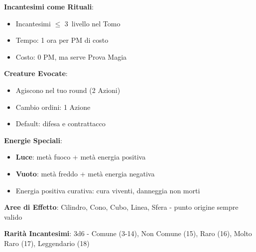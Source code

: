 \documentclass[10pt,a4paper,landscape]{article}
\begin{document}
	\begin{tcolorbox}[title=RITUALI E REGOLE SPECIALI]
		\textbf{Incantesimi come Rituali}: 
		\begin{itemize}[leftmargin=*,noitemsep]
			\item Incantesimi $\leq$ 3\textordmasculine\ livello nel Tomo
			\item Tempo: 1 ora per PM di costo
			\item Costo: 0 PM, ma serve Prova Magia
		\end{itemize}
		
		\textbf{Creature Evocate}:
		\begin{itemize}[leftmargin=*,noitemsep]
			\item Agiscono nel tuo round (2 Azioni)
			\item Cambio ordini: 1 Azione
			\item Default: difesa e contrattacco
		\end{itemize}
		
		\textbf{Energie Speciali}:
		\begin{itemize}[leftmargin=*,noitemsep]
			\item \textbf{Luce}: metà fuoco + metà energia positiva
			\item \textbf{Vuoto}: metà freddo + metà energia negativa
			\item Energia positiva curativa: cura viventi, danneggia non morti
		\end{itemize}
		
		\textbf{Aree di Effetto}: Cilindro, Cono, Cubo, Linea, Sfera - punto origine sempre valido
		
		\textbf{Rarità Incantesimi}: 3d6 - Comune (3-14), Non Comune (15), Raro (16), Molto Raro (17), Leggendario (18)
	\end{tcolorbox}
	
\end{document}

